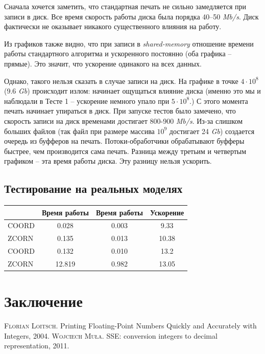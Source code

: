 \documentclass[specialist,subf,href,colorlinks=true,14pt
,times,mtpro,specialist
]{disser}
\begin{document}
Сначала хочется заметить, что стандартная печать не сильно замедляется при записи в диск. 
Все время скорость работы диска была порядка 40--50 \textit{Mb/s}.
Диск фактически не оказывает никакого существенного влияния на работу.

Из графиков также видно, что при записи в \textit{shared-memory} отношение времени работы стандартного алгоритма и ускоренного постоянно (оба графика -- прямые).
Это значит, что ускорение одинакого на всех данных.

Однако, такого нельзя сказать в случае записи на диск.
На графике в точке $4 \cdot 10^8$ (9.6 \textit{Gb}) происходит излом: начинает ощущаться влияние диска (именно это мы и наблюдали в Тесте 1 -- ускорение немного упало при $5 \cdot 10^8$.)
С этого момента печать начинает упираться в диск.
При запуске тестов было замечено, что скорость записи на диск временами достигает 800-900 \textit{Mb/s}.
Из-за слишком больших файлов (так файл при размере массива $10^9$ достигает 24 \textit{Gb}) создается очередь из буфферов на печать.
Потоки-обработчики обрабатывают буфферы быстрее, чем производится сама печать.
Разница между третьим и четвертым графиком -- эта время работы диска. 
Эту разницу нельзя ускорить.

\subsection{Тестирование на реальных моделях}
\begin{tabular}{||l||c|c|c||}
\hline
\hline
& Время работы & Время работы & Ускорение \\
\hline
\hline
COORD & 0.028 & 0.003 & 9.33 \\
\hline
ZCORN & 0.135 & 0.013 & 10.38 \\
\hline
COORD & 0.132 &  0.010 & 13.2 \\
\hline
ZCORN & 12.819 & 0.982 & 13.05 \\
\hline
\hline
\end{tabular}


\section{Заключение}
\newpage

\newpage
\begin{thebibliography}{}

 \textsc{Florian Loitsch}.
Printing Floating-Point Numbers Quickly and Accurately with Integers, 2004.
 \textsc{Wojciech Mu\l a}.
SSE: conversion integers to decimal representation, 2011.


\end{thebibliography}
\end{document}
